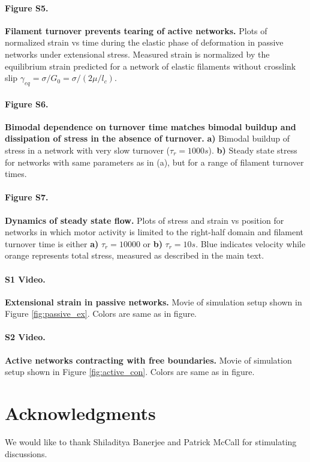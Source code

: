 \documentclass[10pt,letterpaper]{article}
\begin{document}
\paragraph*{Figure S5.}
\label{fig:active_tear}
{\bf  Filament turnover prevents tearing of active networks.}  Plots of normalized strain vs time during the elastic phase of deformation in passive networks under extensional stress.  Measured strain is normalized by the equilibrium strain predicted for a network of elastic filaments without crosslink slip $\gamma_{eq} = \sigma/G_0 = \sigma/(2\mu/l_c)$.  


\paragraph*{Figure S6.}
\label{fig:recycle_supp}
{\bf Bimodal dependence on turnover time matches bimodal buildup and dissipation of stress in the absence of turnover.}   \textbf{a)}  Bimodal buildup of stress in a network with very slow turnover ($\tau_r = 1000s$).  \textbf{b)}  Steady state stress for networks with same parameters as in (a), but  for a range of filament turnover times.   

\paragraph*{Figure S7.}
\label{fig:combo_prof}
{\bf  Dynamics of steady state flow.}  Plots of stress and strain vs position for networks in which motor activity is limited to the right-half domain and filament turnover time is either  \textbf{a)} $\tau_r = 10000$ or  \textbf{b)} $\tau_r = 10 s$.  Blue indicates velocity while orange represents total stress, measured as described in the main text. 


\paragraph*{S1 Video.}
\label{passive_ex_video}
{\bf Extensional strain in passive networks.}  Movie of simulation setup shown in Figure \ref{fig:passive_ex}.  Colors are same as in figure.

\paragraph*{S2 Video.}
\label{active_con_video}
{\bf Active networks contracting with free boundaries.}  Movie of simulation setup shown in Figure \ref{fig:active_con}.  Colors are same as in figure.

\section*{Acknowledgments}
We would like to thank Shiladitya Banerjee and Patrick McCall for stimulating discussions.

\nolinenumbers

% 


\end{document}
